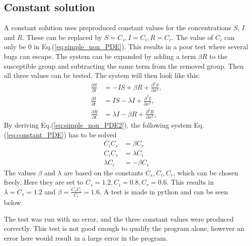 \documentclass[%
twoside,                 %
final,                   %
chapterprefix=true,      %
open=right               %
10pt]{book}
\begin{document}
\subsection{Constant solution}
A constant solution uses preproduced constant values for the concentrations $S$, $I$ and $R$. These can be replaced by $S = C_s,I=C_i,R=C_r$. The value of $C_i$ can only be 0 in Eq.(\ref{eq:simple_non_PDE}). This results in a poor test where several bugs can escape. The system can be expanded by adding a term $\beta R$ to the susceptible group and subtracting the same term from the removed group. Then all three values can be tested. The system will then look like this: 
\begin{equation} \label{eq:simple_non_PDE2}
	\begin{aligned}
	\frac{\partial S}{\partial t} &= -IS + \beta R + \frac{\partial^2 S}{\partial x^2},\\
	\frac{\partial I}{\partial t} &= IS- \lambda I + \frac{\partial^2 I}{\partial x^2},\\
	\frac{\partial R}{\partial t} &= \lambda I - \beta R + \frac{\partial^2 R}{\partial x^2},
	\end{aligned}
\end{equation}
By deriving Eq.(\ref{eq:simple_non_PDE2}), the following system Eq.(\ref{eq:constant_PDE}) has to be solved
\begin{equation} \label{eq:constant_PDE}
	\begin{aligned}
	C_iC_s &= \beta C_r \\
	C_iC_s &= \lambda C_i \\
	\lambda C_i &= -\beta C_r 
	\end{aligned}
\end{equation}
The values $\beta$ and $\lambda$ are based on the constants $C_s,C_i,C_r$, which can be chosen freely. Here they are set to $C_s = 1.2,C_i=0.8,C_r=0.6$. This results in $\lambda= C_s = 1.2$ and $\beta= \frac{C_s C_i}{C_r}=1.6$. A test is made in python and can be seen below.

\bpycod

\epycod

The test was run with no error, and the three constant values were produced correctly. This test is not good enough to qualify the program alone, however an error here would result in a large error in the program. 
\end{document}
